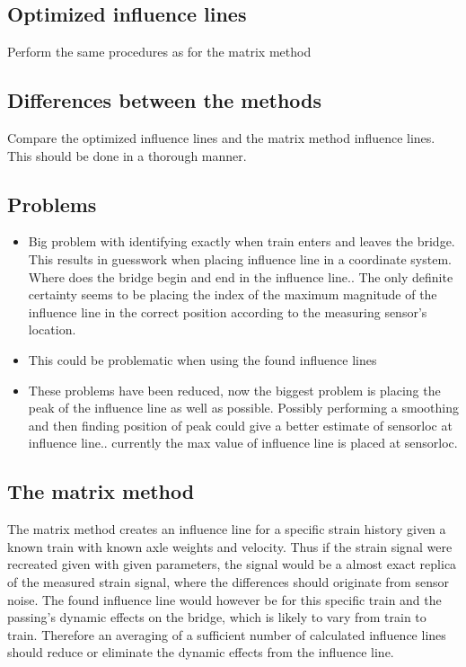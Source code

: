 \subsection{Optimized influence lines}
Perform the same procedures as for the matrix method

\subsection{Differences between the methods}
Compare the optimized influence lines and the matrix method influence lines. This should be done in a thorough manner.
\subsection{Problems}
\begin{itemize}
\item Big problem with identifying exactly when train enters and leaves the bridge. This results in guesswork when placing influence line in a coordinate system. Where does the bridge begin and end in the influence line.. The only definite certainty seems to be placing the index of the maximum magnitude of the influence line in the correct position according to the measuring sensor's location.
\item This could be problematic when using the found influence lines
\item These problems have been reduced, now the biggest problem is placing the peak of the influence line as well as possible. Possibly performing a smoothing and then finding position of peak could give a better estimate of sensorloc at influence line.. currently the max value of influence line is placed at sensorloc.
\end{itemize}


\subsection{The matrix method}
The matrix method creates an influence line for a specific strain history given a known train with known axle weights and velocity. Thus if the strain signal were recreated given with given parameters, the signal would be a almost exact replica of the measured strain signal, where the differences should originate from sensor noise. The found influence line would however be for this specific train and the passing's dynamic effects on the bridge, which is likely to vary from train to train. Therefore an averaging of a sufficient number of calculated influence lines should reduce or eliminate the dynamic effects from the influence line.

